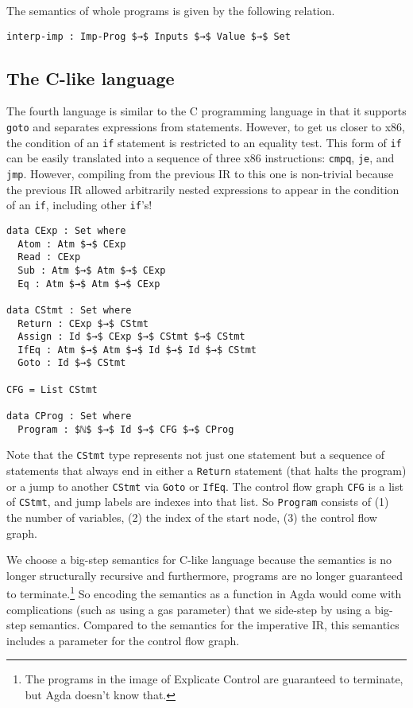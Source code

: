 \documentclass[sigplan,review,dvipsnames,screen,10pt]{acmart}
\begin{document}
The semantics of whole programs is given by the following relation.

\begin{lstlisting}
interp-imp : Imp-Prog $→$ Inputs $→$ Value $→$ Set
\end{lstlisting}

\subsection{The C-like language}
\label{sec:c-lang}

The fourth language is similar to the C programming language in that
it supports \texttt{goto} and separates expressions from statements.
However, to get us closer to x86, the condition of an \lstinline{if}
statement is restricted to an equality test. This form of
\lstinline{if} can be easily translated into a sequence of three x86
instructions: \lstinline{cmpq}, \lstinline{je}, and \lstinline{jmp}.
However, compiling from the previous IR to this one is non-trivial
because the previous IR allowed arbitrarily nested expressions to
appear in the condition of an \lstinline{if}, including other
\lstinline{if}'s!

\begin{lstlisting}
data CExp : Set where
  Atom : Atm $→$ CExp
  Read : CExp
  Sub : Atm $→$ Atm $→$ CExp
  Eq : Atm $→$ Atm $→$ CExp

data CStmt : Set where
  Return : CExp $→$ CStmt
  Assign : Id $→$ CExp $→$ CStmt $→$ CStmt
  IfEq : Atm $→$ Atm $→$ Id $→$ Id $→$ CStmt
  Goto : Id $→$ CStmt

CFG = List CStmt

data CProg : Set where
  Program : $ℕ$ $→$ Id $→$ CFG $→$ CProg
\end{lstlisting}

Note that the \lstinline{CStmt} type represents not just one statement
but a sequence of statements that always end in either a
\lstinline{Return} statement (that halts the program) or a jump to
another \lstinline{CStmt} via \lstinline{Goto} or \lstinline{IfEq}.
The control flow graph \lstinline{CFG} is a list of \lstinline{CStmt},
and jump labels are indexes into that list.  So \lstinline{Program}
consists of (1) the number of variables, (2) the index of the start
node, (3) the control flow graph.

We choose a big-step semantics for C-like language because the
semantics is no longer structurally recursive and furthermore,
programs are no longer guaranteed to terminate.\footnote{The programs
in the image of Explicate Control are guaranteed to terminate, but
Agda doesn't know that.}  So encoding the semantics as a function in
Agda would come with complications (such as using a gas parameter)
that we side-step by using a big-step semantics. Compared to the
semantics for the imperative IR, this semantics includes a parameter
for the control flow graph.
\end{document}
